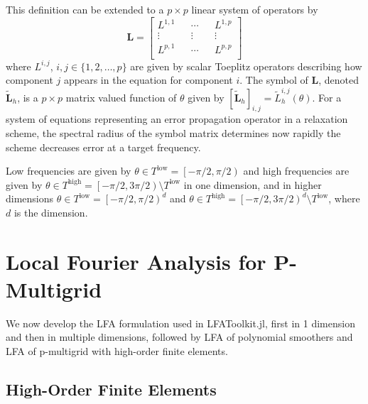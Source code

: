 \documentclass[review]{siamart190516}
\begin{document}
This definition can be extended to a $p \times p$ linear system of operators by
\begin{equation}
\mathbf{L} =
\begin{bmatrix}
    L^{1, 1} && \cdots && L^{1, p}          \\
    \vdots             && \vdots && \vdots  \\
    L^{p, 1} && \cdots && L^{p, p}          \\
\end{bmatrix}
\end{equation}
where $L^{i, j}$, $i, j \in \lbrace 1, 2, \dots, p \rbrace$ are given by scalar Toeplitz operators describing how component $j$ appears in the equation for component $i$.
The symbol of $\mathbf{L}$, denoted $\tilde{\mathbf{L}}_h$, is a $p \times p$ matrix valued function of $\theta$ given by $\left[ \tilde{\mathbf{L}}_h \right]_{i, j} = \tilde{L}_h^{i, j} \left( \theta \right)$.
For a system of equations representing an error propagation operator in a relaxation scheme, the spectral radius of the symbol matrix determines now rapidly the scheme decreases error at a target frequency.

Low frequencies are given by $\theta \in T^{\text{low}} = \left[ - \pi / 2, \pi / 2 \right)$ and high frequencies are given by $\theta \in T^{\text{high}} = \left[ - \pi / 2, 3 \pi / 2 \right) \setminus T^{\text{low}}$ in one dimension, and in higher dimensions $\theta \in T^{\text{low}} = \left[ - \pi / 2, \pi / 2 \right)^d$ and $\theta \in T^{\text{high}} = \left[ - \pi / 2, 3 \pi / 2 \right)^d \setminus T^{\text{low}}$, where $d$ is the dimension.

\section{Local Fourier Analysis for P-Multigrid}\label{sec:lfa}

We now develop the LFA formulation used in LFAToolkit.jl, first in 1 dimension and then in multiple dimensions, followed by LFA of polynomial smoothers and LFA of p-multigrid with high-order finite elements.

\subsection{High-Order Finite Elements}\label{sec:highorder}
\end{document}

